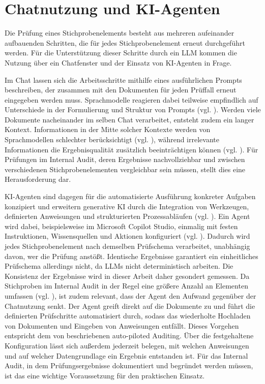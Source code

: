 \section{Chatnutzung und KI-Agenten}
\label{sec:chat_agenten}

Die Prüfung eines Stichprobenelements besteht aus mehreren aufeinander aufbauenden Schritten, die für jedes Stichprobenelement erneut durchgeführt werden. Für die Unterstützung dieser Schritte durch ein \ac{LLM} kommen die Nutzung über ein Chatfenster und der Einsatz von \ac{KI}-Agenten in Frage.

Im Chat lassen sich die Arbeitsschritte mithilfe eines ausführlichen Prompts beschreiben, der zusammen mit den Dokumenten für jeden Prüffall erneut eingegeben werden muss. Sprachmodelle reagieren dabei teilweise empfindlich auf Unterschiede in der Formulierung und Struktur von Prompts (vgl. \cite[S.~16]{sclar2024quantifying}). Werden viele Dokumente nacheinander im selben Chat verarbeitet, entsteht zudem ein langer Kontext. Informationen in der Mitte solcher Kontexte werden von Sprachmodellen schlechter berücksichtigt (vgl. \cite[S.~157]{liu2024lost}), während irrelevante Informationen die Ergebnisqualität zusätzlich beeinträchtigen können (vgl. \cite[S.~8]{shi2023distracted}). Für Prüfungen im Internal Audit, deren Ergebnisse nachvollziehbar und zwischen verschiedenen Stichprobenelementen vergleichbar sein müssen, stellt dies eine Herausforderung dar.

\ac{KI}-Agenten sind dagegen für die automatisierte Ausführung konkreter Aufgaben konzipiert und erweitern generative \ac{KI} durch die Integration von Werkzeugen, definierten Anweisungen und strukturierten Prozessabläufen (vgl. \cite[S.~1]{sapkota2026agenticai}). Ein Agent wird dabei, beispielsweise im Microsoft Copilot Studio, einmalig mit festen Instruktionen, Wissensquellen und Aktionen konfiguriert (vgl. \cite{microsoft2026declarative}). Dadurch wird jedes Stichprobenelement nach demselben Prüfschema verarbeitet, unabhängig davon, wer die Prüfung anstößt. Identische Ergebnisse garantiert ein einheitliches Prüfschema allerdings nicht, da \acp{LLM} nicht deterministisch arbeiten. Die Konsistenz der Ergebnisse wird in dieser Arbeit daher gesondert gemessen. Da Stichproben im Internal Audit in der Regel eine größere Anzahl an Elementen umfassen (vgl. \cite{freudenberg2026auditsample}), ist zudem relevant, dass der Agent den Aufwand gegenüber der Chatnutzung senkt. Der Agent greift direkt auf die Dokumente zu und führt die definierten Prüfschritte automatisiert durch, sodass das wiederholte Hochladen von Dokumenten und Eingeben von Anweisungen entfällt. Dieses Vorgehen entspricht dem von \textcite[S.~4, 20]{schreyer2024agentic} beschriebenen auto-piloted Auditing. Über die festgehaltene Konfiguration lässt sich außerdem jederzeit belegen, mit welchen Anweisungen und auf welcher Datengrundlage ein Ergebnis entstanden ist. Für das Internal Audit, in dem Prüfungsergebnisse dokumentiert und begründet werden müssen, ist das eine wichtige Voraussetzung für den praktischen Einsatz.


